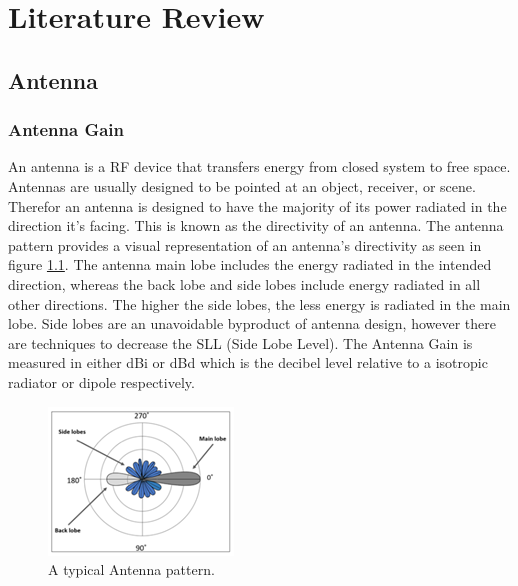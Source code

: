 %
%
%
\ifstandalone
\tableofcontents
\fi
\chapter{Literature Review \label{ch:literature}}
\section{Antenna}\label{sec:antenna}
\subsection{Antenna Gain}
An antenna is a RF device that transfers energy from closed system to free space. Antennas are usually designed to be pointed at an object, receiver, or scene. Therefor an antenna is designed to have the majority of its power radiated in the direction it’s facing. This is known as the directivity of an antenna. The antenna pattern provides a visual representation of an antenna’s directivity as seen in figure \ref{fig:chp2_antenna_pattern}. The antenna main lobe includes the energy radiated in the intended direction, whereas the back lobe and side lobes include energy radiated in all other directions. The higher the side lobes, the less energy is radiated in the main lobe. Side lobes are an unavoidable byproduct of antenna design, however there are techniques to decrease the SLL (Side Lobe Level). The Antenna Gain is measured in either dBi or dBd which is the decibel level relative to a isotropic radiator or dipole respectively.

    \begin{figure}[H]
    \centering
    \includegraphics[width=0.3\linewidth]{Figures/chp2_antenna_pattern.png}
    \caption{A typical Antenna pattern.}
    \label{fig:chp2_antenna_pattern}
    \end{figure}

